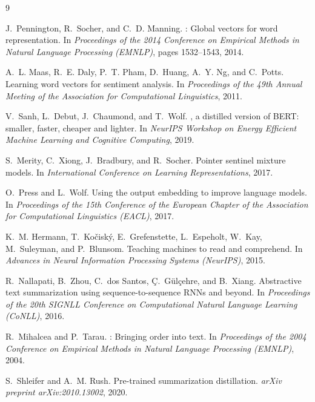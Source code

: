 \documentclass[11pt,a4paper]{article}
\begin{document}
\begin{thebibliography}{9}

J.~Pennington, R.~Socher, and C.~D. Manning.
: Global vectors for word representation.
\newblock In \emph{Proceedings of the 2014 Conference on Empirical Methods in Natural Language Processing (EMNLP)}, pages 1532--1543, 2014.

A.~L. Maas, R.~E. Daly, P.~T. Pham, D.~Huang, A.~Y. Ng, and C.~Potts.
\newblock Learning word vectors for sentiment analysis.
\newblock In \emph{Proceedings of the 49th Annual Meeting of the Association for Computational Linguistics}, 2011.

V.~Sanh, L.~Debut, J.~Chaumond, and T.~Wolf.
, a distilled version of {BERT}: smaller, faster, cheaper and lighter.
\newblock In \emph{NeurIPS Workshop on Energy Efficient Machine Learning and Cognitive Computing}, 2019.

S.~Merity, C.~Xiong, J.~Bradbury, and R.~Socher.
\newblock Pointer sentinel mixture models.
\newblock In \emph{International Conference on Learning Representations}, 2017.

O.~Press and L.~Wolf.
\newblock Using the output embedding to improve language models.
\newblock In \emph{Proceedings of the 15th Conference of the European Chapter of the
  Association for Computational Linguistics (EACL)}, 2017.


K.~M. Hermann, T.~Ko\v{c}isk\'y, E.~Grefenstette, L.~Espeholt, W.~Kay, M.~Suleyman, and P.~Blunsom.
\newblock Teaching machines to read and comprehend.
\newblock In \emph{Advances in Neural Information Processing Systems (NeurIPS)}, 2015.

R.~Nallapati, B.~Zhou, C.~dos Santos, \c{C}.~G\"ul\c{c}ehre, and B.~Xiang.
\newblock Abstractive text summarization using sequence-to-sequence {RNNs} and beyond.
\newblock In \emph{Proceedings of the 20th SIGNLL Conference on Computational Natural Language Learning (CoNLL)}, 2016.

R.~Mihalcea and P.~Tarau.
: Bringing order into text.
\newblock In \emph{Proceedings of the 2004 Conference on Empirical Methods in Natural Language Processing (EMNLP)}, 2004.

S.~Shleifer and A.~M. Rush.
\newblock Pre-trained summarization distillation.
\newblock \emph{arXiv preprint arXiv:2010.13002}, 2020.


\end{thebibliography}
\end{document}
